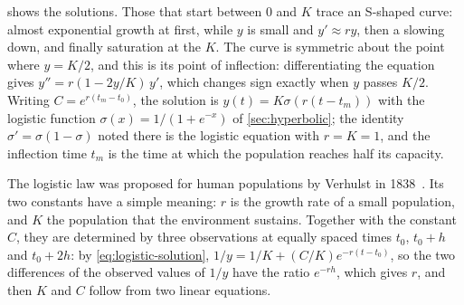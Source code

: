  shows the solutions. Those that start between $0$ and $K$ trace an S-shaped curve: almost exponential growth at first, while $y$ is small and $y'\approx ry$, then a slowing down, and finally saturation at the  $K$. The curve is symmetric about the point where $y=K/2$, and this is its point of inflection: differentiating the equation gives $y''=r(1-2y/K)\,y'$, which changes sign exactly when $y$ passes $K/2$. Writing $C=e^{r(t_m-t_0)}$, the solution is $y(t)=K\sigma(r(t-t_m))$ with the logistic function $\sigma(x)=1/(1+e^{-x})$ of \cref{sec:hyperbolic}; the identity $\sigma'=\sigma(1-\sigma)$ noted there is the logistic equation with $r=K=1$, and the inflection time $t_m$ is the time at which the population reaches half its capacity.

\begin{figure}
\end{figure}

The logistic law was proposed for human populations by Verhulst in 1838~\cite{verhulst1838}. Its two constants have a simple meaning: $r$ is the growth rate of a small population, and $K$ the population that the environment sustains. Together with the constant $C$, they are determined by three observations at equally spaced times $t_0$, $t_0+h$ and $t_0+2h$: by \eqref{eq:logistic-solution}, $1/y=1/K+(C/K)e^{-r(t-t_0)}$, so the two differences of the observed values of $1/y$ have the ratio $e^{-rh}$, which gives $r$, and then $K$ and $C$ follow from two linear equations.

